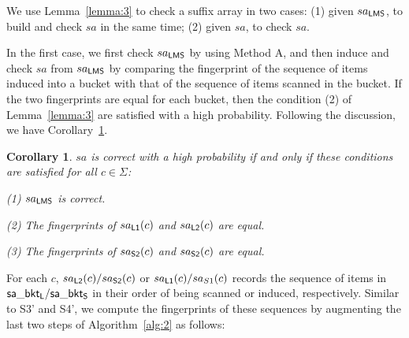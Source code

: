 \documentclass[10pt,journal,compsoc]{IEEEtran}
\newtheorem{Corollary}{Corollary}
\begin{document}
	
	We use Lemma~\ref{lemma:3} to check a suffix array in two cases: (1) given $sa_{\sf LMS}$, to build and check $sa$ in the same time; (2) given $sa$, to check $sa$.
	
	\vspace{1ex}  In the first case, we first check $sa_{\sf LMS}$ by using Method A, and then induce and check $sa$ from $sa_{\sf LMS}$ by comparing the fingerprint of the sequence of items induced into a bucket with that of the sequence of items scanned in the bucket. If the two fingerprints are equal for each bucket, then the condition (2) of Lemma~\ref{lemma:3} are satisfied with a high probability. Following the discussion, we have Corollary~\ref{corollary:3}.
	
	\begin{Corollary} \label{corollary:3}
		$sa$ is correct with a high probability if and only if these conditions are satisfied for all $c \in \Sigma$:
		
		(1) $sa_{\sf LMS}$ is correct.
		
		(2) The fingerprints of $sa_{\sf L1}(c)$ and $sa_{\sf L2}(c)$ are equal.
		
		(3) The fingerprints of $sa_{\sf S2}(c)$ and $sa_{\sf S2}(c)$ are equal.
		
	\end{Corollary}
	
	For each $c$, $sa_{\sf L2}(c)/sa_{\sf S2}(c)$ or $sa_{\sf L1}(c)/sa_{S1}(c)$ records the sequence of items in ${\sf sa\_bkt_L}/{\sf sa\_bkt_S}$ in their order of being scanned or induced, respectively. Similar to S3' and S4', we compute the fingerprints of these sequences by augmenting the last two steps of Algorithm~\ref{alg:2} as follows:
	
\end{document}
